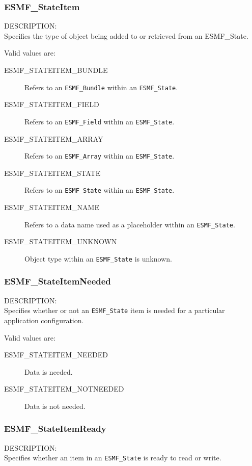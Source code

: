 
\subsubsection{ESMF\_StateItem}
\label{opt:stateitem}

{\sf DESCRIPTION:\\}
Specifies the type of object being added to or retrieved from an
{ESMF\_State.}

Valid values are:
\begin{description}
   \item [ESMF\_STATEITEM\_BUNDLE] 
         Refers to an {\tt ESMF\_Bundle} within an {\tt ESMF\_State}.
   \item [ESMF\_STATEITEM\_FIELD]
         Refers to an {\tt ESMF\_Field} within an {\tt ESMF\_State}.
   \item [ESMF\_STATEITEM\_ARRAY]
         Refers to an {\tt ESMF\_Array} within an {\tt ESMF\_State}.
   \item [ESMF\_STATEITEM\_STATE]
         Refers to an {\tt ESMF\_State} within an {\tt ESMF\_State}.
   \item [ESMF\_STATEITEM\_NAME]
         Refers to a data name used as a placeholder within 
         an {\tt ESMF\_State}.
   \item [ESMF\_STATEITEM\_UNKNOWN]
         Object type within an {\tt ESMF\_State} is unknown.
\end{description}

\subsubsection{ESMF\_StateItemNeeded}
\label{opt:stateitemneeded}
{\sf DESCRIPTION:\\}
Specifies whether or not an {\tt ESMF\_State} item is needed for a 
particular application configuration.

Valid values are:
\begin{description}
   \item [ESMF\_STATEITEM\_NEEDED] 
         Data is needed.
   \item [ESMF\_STATEITEM\_NOTNEEDED]
         Data is not needed.
\end{description}

\subsubsection{ESMF\_StateItemReady}
\label{opt:stateitemready}
{\sf DESCRIPTION:\\}
Specifies whether an item in an {\tt ESMF\_State} is ready to 
read or write.

